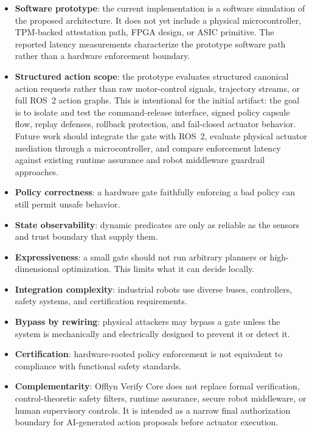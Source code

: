 \documentclass[10pt]{article}
\newcommand{\ovc}{Offlyn Verify Core\xspace}
\begin{document}
\begin{itemize}[leftmargin=*]
  \item \textbf{Software prototype}: the current implementation is a software simulation of the proposed architecture. It does not yet include a physical microcontroller, TPM-backed attestation path, FPGA design, or ASIC primitive. The reported latency measurements characterize the prototype software path rather than a hardware enforcement boundary.
  \item \textbf{Structured action scope}: the prototype evaluates structured canonical action requests rather than raw motor-control signals, trajectory streams, or full ROS~2 action graphs. This is intentional for the initial artifact: the goal is to isolate and test the command-release interface, signed policy capsule flow, replay defenses, rollback protection, and fail-closed actuator behavior. Future work should integrate the gate with ROS~2, evaluate physical actuator mediation through a microcontroller, and compare enforcement latency against existing runtime assurance and robot middleware guardrail approaches.
  \item \textbf{Policy correctness}: a hardware gate faithfully enforcing a bad policy can still permit unsafe behavior.
  \item \textbf{State observability}: dynamic predicates are only as reliable as the sensors and trust boundary that supply them.
  \item \textbf{Expressiveness}: a small gate should not run arbitrary planners or high-dimensional optimization. This limits what it can decide locally.
  \item \textbf{Integration complexity}: industrial robots use diverse buses, controllers, safety systems, and certification requirements.
  \item \textbf{Bypass by rewiring}: physical attackers may bypass a gate unless the system is mechanically and electrically designed to prevent it or detect it.
  \item \textbf{Certification}: hardware-rooted policy enforcement is not equivalent to compliance with functional safety standards.
  \item \textbf{Complementarity}: \ovc does not replace formal verification, control-theoretic safety filters, runtime assurance, secure robot middleware, or human supervisory controls. It is intended as a narrow final authorization boundary for AI-generated action proposals before actuator execution.
\end{itemize}
\end{document}
